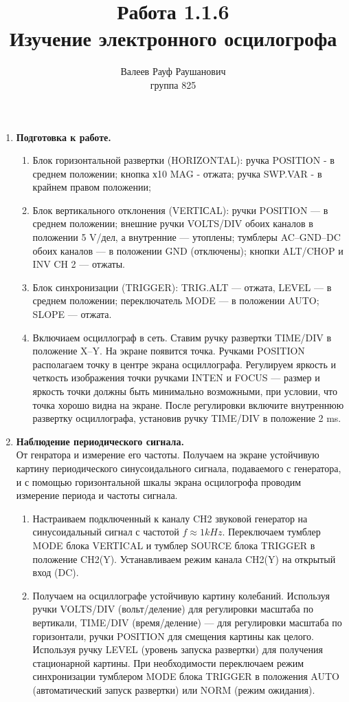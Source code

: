 \documentclass[a4paper, 12pt]{article}%
\author{Валеев Рауф Раушанович \\
группа 825}
\title{\textbf{Работа 1.1.6 \\
Изучение электронного осцилогрофа}}
\begin{document}
\maketitle
\newpage
\begin{enumerate}
\item	
	\textbf{Подготовка к работе.}
	\begin{enumerate}
	\item Блок горизонтальной развертки (HORIZONTAL): ручка POSITION -  в среднем положении; кнопка х10 MAG - отжата; ручка SWP.VAR - в крайнем правом положении;
	\item Блок вертикального отклонения (VERTIСAL): ручки POSITION — в среднем положении; внешние ручки VOLTS/DIV обоих каналов в положении 5 V/дел, а внутренние — утоплены; тумблеры AC–GND–DC обоих каналов — в положении GND (отключены); кнопки ALT/CHOP и INV CH 2 — отжаты.
	\item Блок синхронизации (TRIGGER): TRIG.ALT — отжата, LEVEL — в среднем положении; переключатель MODE — в положении AUTO; SLOPE — отжата.
	\item Включиаем осциллограф в сеть. Ставим ручку развертки
TIME/DIV в положение X–Y. На экране появится точка. Ручками POSITION располагаем точку в центре экрана осциллографа. Регулируем яркость и четкость изображения точки ручками INTEN и FOCUS — размер и яркость точки должны быть минимально возможными, при условии, что точка хорошо видна на экране. После регулировки включите внутреннюю развертку осциллографа, установив ручку TIME/DIV в положение 2 ms.	
	\end{enumerate}
\item 
	\textbf{Наблюдение периодического сигнала.} \\ От генратора и измерение его частоты. Получаем на экране устойчивую картину периодического синусоидального сигнала, подаваемого с генератора, и с помощью горизонтальной шкалы экрана осцилогрофа проводим измерение периода и частоты сигнала. 
	\begin{enumerate}
	\item Настраиваем подключенный к каналу CH2 звуковой генератор на синусоидальный сигнал с частотой $f\approx 1 kHz$. Переключаем тумблер MODE блока VERTICAL и тумблер SOURCE блока TRIGGER в положение CH2(Y). Устанавливаем режим канала CH2(Y) на открытый вход (DC).
	\item Получаем на осциллографе устойчивую картину колебаний. Используя ручки VOLTS/DIV (вольт/деление) для регулировки масштаба по вертикали, TIME/DIV (время/деление) — для регулировки масштаба по горизонтали, ручки POSITION для смещения картины как целого. Используя ручку LEVEL (уровень запуска развертки) для получения стационарной картины. При необходимости переключаем режим синхронизации тумблером MODE блока TRIGGER в положения AUTO (автоматический запуск развертки) или NORM (режим ожидания).

\end{enumerate}
\end{enumerate}
\end{document}
